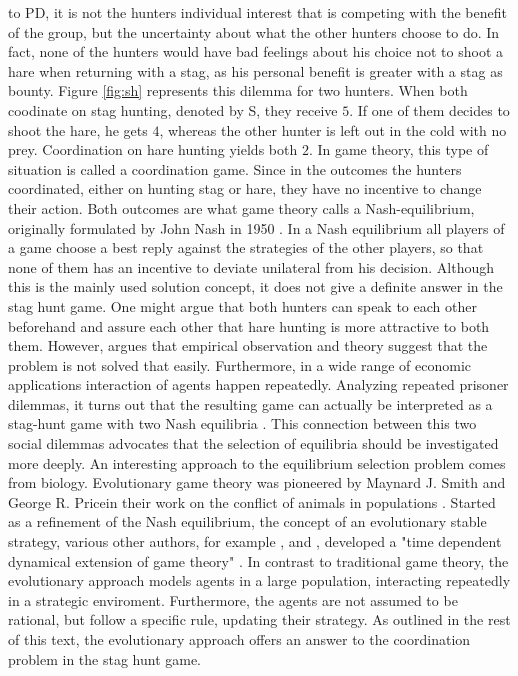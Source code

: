 \documentclass[11pt]{article}
\begin{document}
to PD, it is not the hunters individual interest that is competing with the
benefit of the group, but the uncertainty about what the other hunters choose
to do. In fact, none of the hunters would have bad feelings about his choice
not to shoot a hare when returning with a stag, as his personal benefit is 
greater with a stag as bounty. Figure \ref{fig:sh} represents this dilemma 
for two hunters. When both coodinate on stag hunting, denoted by S, they receive 
$5$. If one of them decides to shoot the hare, he gets $4$, whereas
the other hunter is left out in the cold with no prey. Coordination on hare
hunting yields both $2$. In game theory, this type of situation is called
a coordination game. Since in the outcomes the hunters coordinated, either
on hunting stag or hare, they have no incentive to change their action. 
Both outcomes are what game theory calls a Nash-equilibrium, originally
formulated by John Nash in 1950 \parencite{nash_equilibrium_1950}. In a 
Nash equilibrium all players of a game choose a best reply against
the strategies of the other players, so that none of them has an incentive
to deviate unilateral from his decision. Although this is the mainly used
solution concept, it does not give a definite answer in the stag hunt game.
One might argue that both hunters can speak to each other beforehand and
assure each other that hare hunting is more attractive to both them. However,
\textcite{camerer_behavioral_2003} argues that empirical observation and theory 
suggest that the problem is not solved that easily.
Furthermore, in a wide range of economic applications interaction of agents
happen repeatedly. Analyzing repeated prisoner dilemmas, it turns 
out that the resulting game can actually be interpreted as a stag-hunt game with
two Nash equilibria \parencite{skyrms_stag_2004}.
This connection between this two social dilemmas advocates that
the selection of equilibria should be investigated more deeply. 
An interesting approach to the equilibrium selection problem comes from
biology. Evolutionary game theory was pioneered by Maynard J. Smith and George
R. Pricein their work on the conflict of animals in populations 
\parencite{smith_lhe_1973}. Started as a refinement of the Nash equilibrium,
the concept of an evolutionary stable strategy, various other authors, for 
example \textcite{taylor_evolutionary_1978}, \textcite{hofbauer_note_1979} and
\textcite{zeeman_dynamics_1981}, developed a "time dependent dynamical
extension of game theory" \parencite[55]{hanauske_evolutionare_2011}.
In contrast to traditional game theory, the evolutionary approach  models
 agents in a large population, interacting repeatedly in a strategic enviroment. 
Furthermore, the agents are not assumed to be rational, but follow a specific 
rule, updating their strategy. 
As outlined in the rest of this text, the
evolutionary approach offers an answer to the coordination problem in the
stag hunt game.
\end{document}
